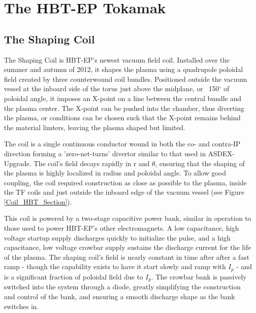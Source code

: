 \documentclass[aps,prl,twocolumn,superscriptaddress,groupedaddress]{revtex4}  %
\begin{document}

\section{The HBT-EP Tokamak}
	
\subsection{The Shaping Coil}
    The Shaping Coil is HBT-EP's newest vacuum field coil.  Installed over the summer and autumn of 2012, it shapes the plasma using a quadrupole poloidal field created by three counterwound coil bundles.  Positioned outside the vacuum vessel at the inboard side of the torus just above the midplane, or ~150$^{\circ}$ of poloidal angle, it imposes an X-point on a line between the central bundle and the plasma center.  The X-point can be pushed into the chamber, thus diverting the plasma, or conditions can be chosen such that the X-point remains behind the material limters, leaving the plasma shaped but limited.\par
    The coil is a single continuous conductor wound in both the co- and contra-IP direction forming a 'zero-net-turns' divertor similar to that used in ASDEX-Upgrade\cite{Keilhacker}.  The coil's field decays rapidly in r and $\theta$, ensuring that the shaping of the plasma is highly localized in radius and poloidal angle.  To allow good coupling, the coil required construction as close as possible to the plasma, inside the TF coils and just outside the inboard edge of the vacuum vessel (see Figure \ref{Coil_HBT_Section}).\par
This coil is powered by a two-stage capacitive power bank, similar in operation to those used to power HBT-EP's other electromagnets\cite{Gates}. A low capacitance, high voltage startup supply discharges quickly to initialize the pulse, and a high capacitance, low voltage crowbar supply sustains the discharge current for the life of the plasma.  The shaping coil's field is nearly constant in time after after a fast ramp - though the capability exists to have it start slowly and ramp with $I_p$ - and is a significant fraction of poloidal field due to $I_p$.  The crowbar bank is passively switched into the system through a diode, greatly simplifying the construction and control of the bank, and ensuring a smooth discharge shape as the bank switches in.
\end{document}
